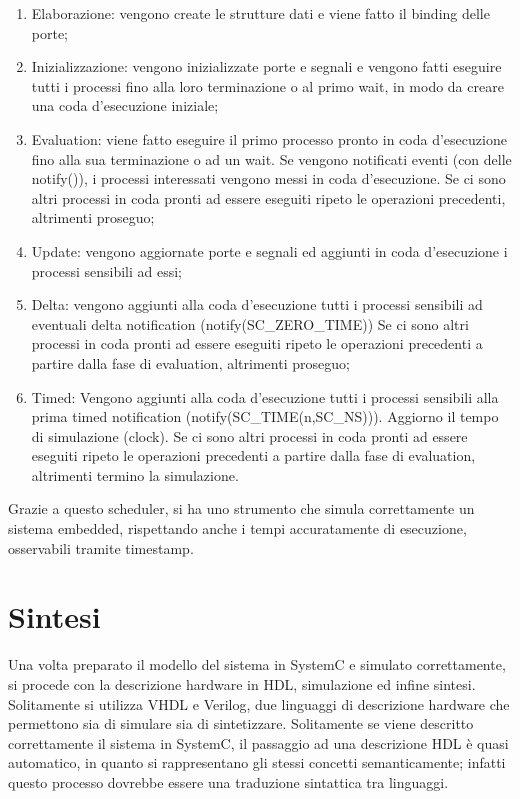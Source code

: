 \documentclass[a4paper,titlepage]{book}
\begin{document}
\begin{enumerate}
\item Elaborazione: vengono create le strutture dati e viene fatto il binding delle porte;
\item Inizializzazione: vengono inizializzate porte e segnali e vengono fatti eseguire tutti i processi fino alla loro terminazione o al primo wait, in modo da creare una coda d'esecuzione iniziale;
\item Evaluation: viene fatto eseguire il primo processo pronto in coda d'esecuzione fino alla sua terminazione o ad un wait. Se vengono notificati eventi (con delle notify()), i processi interessati vengono messi in coda d'esecuzione. Se ci sono altri processi in coda pronti ad essere eseguiti ripeto le operazioni precedenti, altrimenti proseguo;
\item Update: vengono aggiornate porte e segnali ed aggiunti in coda d'esecuzione i processi sensibili ad essi;
\item Delta: vengono aggiunti alla coda d'esecuzione tutti i processi sensibili ad eventuali delta notification (notify(SC\_ZERO\_TIME)) Se ci sono altri processi in coda pronti ad essere eseguiti ripeto le operazioni precedenti a partire dalla fase di evaluation, altrimenti proseguo;
\item Timed: Vengono aggiunti alla coda d'esecuzione tutti i processi sensibili alla prima timed notification (notify(SC\_TIME(n,SC\_NS))). Aggiorno il tempo di simulazione (clock). Se ci sono altri processi in coda pronti ad essere eseguiti ripeto le operazioni precedenti a partire dalla fase di evaluation, altrimenti termino la simulazione.
\end{enumerate}

Grazie a questo scheduler, si ha uno strumento che simula correttamente un sistema embedded, rispettando anche i tempi accuratamente di esecuzione, osservabili tramite timestamp.

\section{Sintesi}

Una volta preparato il modello del sistema in SystemC e simulato correttamente, si procede con la descrizione hardware in HDL, simulazione ed infine sintesi. Solitamente si utilizza VHDL e Verilog, due linguaggi di descrizione hardware che permettono sia di simulare sia di sintetizzare. Solitamente se viene descritto correttamente il sistema in SystemC, il passaggio ad una descrizione HDL è quasi automatico, in quanto si rappresentano gli stessi concetti semanticamente; infatti questo processo dovrebbe essere una traduzione sintattica tra linguaggi.
\end{document}
